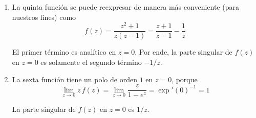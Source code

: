 \begin{solution}
\begin{enumerate}[label=(\alph*)]
    \item La quinta función se puede reexpresar de manera más conveniente (para nuestros fines) como
    $$f(z) = \frac {z^2 + 1} {z (z - 1)} = \frac {z + 1} {z - 1} - \frac 1z$$
    
    El primer término es analítico en $z = 0$. Por ende, la parte singular de $f(z)$ en $z = 0$ es solamente el segundo término $-1/z$.
    
    \item La sexta función tiene un polo de orden $1$ en $z = 0$, porque
    $$\lim_{z \to 0} z \, f(z) = \lim_{z \to 0} \frac z {1 - e^z} = \exp'(0)^{-1} = 1$$
    
    La parte singular de $f(z)$ en $z = 0$ es $1/z$.
\end{enumerate}
\end{solution}

